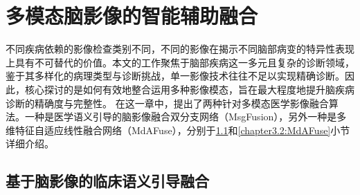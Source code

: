 \chapter{多模态脑影像的智能辅助融合} 
\label{chapter:multiFusion}
不同疾病依赖的影像检查类别不同，不同的影像在揭示不同脑部病变的特异性表现上具有不可替代的价值。本文的工作聚焦于脑部疾病这一多元且复杂的诊断领域，鉴于其多样化的病理类型与诊断挑战，单一影像技术往往不足以实现精确诊断。因此，核心探讨的是如何有效地整合运用多种影像模态，旨在最大程度地提升脑疾病诊断的精确度与完整性。
在这一章中，提出了两种针对多模态医学影像融合算法。一种是医学语义引导的脑影像融合双分支网络（MsgFusion）\cite{wen2023msgfusion}，另外一种是多维特征自适应线性融合网络（MdAFuse）\cite{wen2024tip}，分别于\ref{chapter3.1:MsgFusion}和\ref{chapter3.2:MdAFuse}小节详细介绍。

\section{基于脑影像的临床语义引导融合}\label{chapter3.1:MsgFusion}

